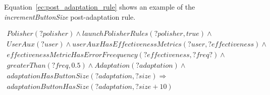 Equation~\ref{ec:post_adaptation_rule} shows an example of the \textit{incrementButtonSize} 
post-adaptation rule.

\footnotesize
\begin{equation} \label{ec:post_adaptation_rule}
  \begin{align*} 
  Polisher(?polisher) ∧ launchPolisherRules(?polisher, true) ∧\\
  UserAux(?user) ∧ userAuxHasEffectivenessMetrics(?user, ?effectiveness) ∧ \\
  effectivenessMetricHasErrorFreequency(?effectiveness, ?freq?) ∧\\
  greaterThan(?freq, 0.5) ∧ Adaptation(?adaptation) ∧\\
  adaptationHasButtonSize(?adaptation, ?size)
  \Rightarrow \\
  adaptationButtonHasSize(?adaptation, ?size + 10)
  \end{align*}
\end{equation}
\normalsize
